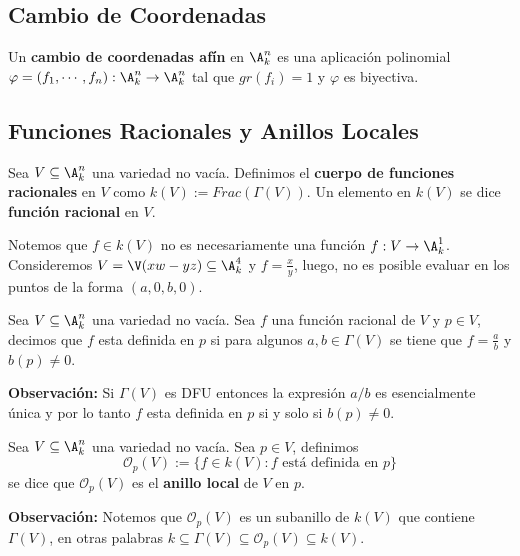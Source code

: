 \documentclass{article}
\begin{document}
\subsection{Cambio de Coordenadas}
\begin{dfn}
    Un \textbf{cambio de coordenadas afín} en $\A_{k}^{n}$ es una aplicación polinomial 
    $\varphi=(f_{1},\cdots,f_{n}):\A_{k}^{n}\to\A_{k}^{n}$ tal que $gr(f_{i})=1$ y $\varphi$ es 
    biyectiva.
\end{dfn}

\subsection{Funciones Racionales y Anillos Locales}

\begin{dfn}
    Sea $V\subseteq\A_{k}^{n}$ una variedad no vacía. Definimos el \textbf{cuerpo de funciones 
    racionales} en $V$ como $k(V):=Frac(\Gamma(V))$. Un elemento en $k(V)$ se dice \textbf{función 
    racional} en $V$.
\end{dfn}
\noindent Notemos que $f\in k(V)$ no es necesariamente una función $f:V\to\A_{k}^{1}$. 
Consideremos $V=\V(xw-yz)\subseteq\A_{k}^{4}$ y $f=\frac{x}{y}$, luego, no es posible evaluar en
los puntos de la forma $(a,0,b,0)$.
\vspace{2mm}
\begin{dfn}
    Sea $V\subseteq\A_{k}^{n}$ una variedad no vacía. Sea $f$ una función racional de $V$ y 
    $p\in V$, decimos que $f$ esta definida en $p$ si para algunos $a,b\in\Gamma(V)$ se tiene que 
    $f=\frac{a}{b}$ y $b(p)\neq0$.
\end{dfn}
\noindent\textbf{Observación:} Si $\Gamma(V)$ es DFU entonces la expresión $a/b$ es esencialmente 
única y por lo tanto $f$ esta definida en $p$ si y solo si $b(p)\neq0$.
\begin{dfn}
    Sea $V\subseteq\A_{k}^{n}$ una variedad no vacía. Sea $p\in V$, definimos
    \begin{equation*}
        \mathcal{O}_{p}(V):=\{f\in k(V):f\text{ está definida en }p\}
    \end{equation*}
    se dice que $\mathcal{O}_{p}(V)$ es el \textbf{anillo local} de $V$ en $p$.
\end{dfn}
\noindent\textbf{Observación:} Notemos que $\mathcal{O}_{p}(V)$ es un subanillo de $k(V)$ que 
contiene $\Gamma(V)$, en otras palabras $k\subseteq\Gamma(V)\subseteq\mathcal{O}_{p}(V)\subseteq 
k(V)$.
\end{document}
